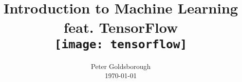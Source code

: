 





\begin{frame}[plain]
    \title{
      \vspace{1.2cm}\\
      Introduction to Machine Learning\\
      feat. TensorFlow\\
      \vspace{1cm}
      \texttt{[image: tensorflow]}}
    \author{
      Peter Goldsborough \\
      \vspace{0.5cm}
      \today
    }
    \titlepage
\end{frame}

















